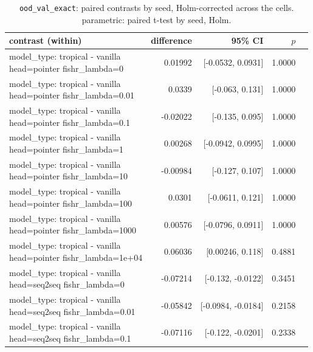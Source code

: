 \documentclass[10pt]{article}
\makeatletter
\newcommand{\stackcell}[1]{\begin{tabular}[t]{@{}l@{}}#1\end{tabular}}
\makeatother
\begin{document}
{\small
\begin{longtable}{lrrrl}
\caption{\texttt{ood\_val\_exact}: paired contrasts by seed, Holm-corrected across the cells. parametric: paired t-test by seed, Holm.}\label{tab:paired-ood_val_exact}\\
\toprule
contrast (within) & difference & 95\% CI & $p$ & \\
\midrule
\endhead
\stackcell{model\_type: tropical - vanilla\\\footnotesize head=pointer fishr\_lambda=0 } & 0.01992 & [-0.0532, 0.0931] & 1.0000 & \\
\stackcell{model\_type: tropical - vanilla\\\footnotesize head=pointer fishr\_lambda=0.01 } & 0.0339 & [-0.063, 0.131] & 1.0000 & \\
\stackcell{model\_type: tropical - vanilla\\\footnotesize head=pointer fishr\_lambda=0.1 } & -0.02022 & [-0.135, 0.095] & 1.0000 & \\
\stackcell{model\_type: tropical - vanilla\\\footnotesize head=pointer fishr\_lambda=1 } & 0.00268 & [-0.0942, 0.0995] & 1.0000 & \\
\stackcell{model\_type: tropical - vanilla\\\footnotesize head=pointer fishr\_lambda=10 } & -0.00984 & [-0.127, 0.107] & 1.0000 & \\
\stackcell{model\_type: tropical - vanilla\\\footnotesize head=pointer fishr\_lambda=100 } & 0.0301 & [-0.0611, 0.121] & 1.0000 & \\
\stackcell{model\_type: tropical - vanilla\\\footnotesize head=pointer fishr\_lambda=1000 } & 0.00576 & [-0.0796, 0.0911] & 1.0000 & \\
\stackcell{model\_type: tropical - vanilla\\\footnotesize head=pointer fishr\_lambda=1e+04 } & 0.06036 & [0.00246, 0.118] & 0.4881 & \\
\stackcell{model\_type: tropical - vanilla\\\footnotesize head=seq2seq fishr\_lambda=0 } & -0.07214 & [-0.132, -0.0122] & 0.3451 & \\
\stackcell{model\_type: tropical - vanilla\\\footnotesize head=seq2seq fishr\_lambda=0.01 } & -0.05842 & [-0.0984, -0.0184] & 0.2158 & \\
\stackcell{model\_type: tropical - vanilla\\\footnotesize head=seq2seq fishr\_lambda=0.1 } & -0.07116 & [-0.122, -0.0201] & 0.2338 & \\

\end{longtable}}
\end{document}

